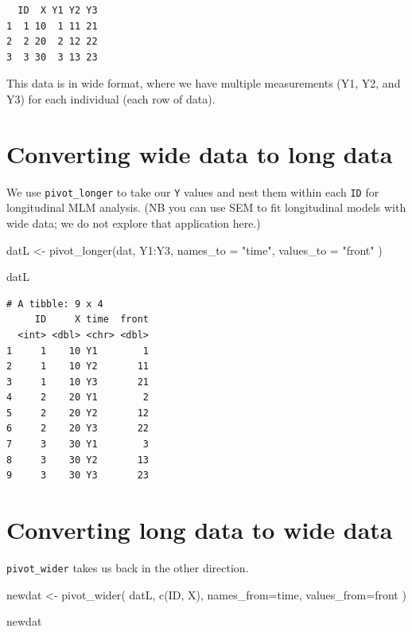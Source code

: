 \documentclass[
  letterpaper,
  DIV=11,
  numbers=noendperiod]{scrreprt}
\newenvironment{Shaded}{\begin{snugshade}}{\end{snugshade}}
\newcommand{\AttributeTok}[1]{\textcolor[rgb]{0.49,0.56,0.16}{#1}}
\newcommand{\FunctionTok}[1]{\textcolor[rgb]{0.02,0.16,0.49}{#1}}
\newcommand{\NormalTok}[1]{\textcolor[rgb]{0.00,0.44,0.13}{#1}}
\newcommand{\OtherTok}[1]{\textcolor[rgb]{0.00,0.44,0.13}{#1}}
\newcommand{\SpecialCharTok}[1]{\textcolor[rgb]{0.25,0.44,0.63}{#1}}
\newcommand{\StringTok}[1]{\textcolor[rgb]{0.25,0.44,0.63}{#1}}
\begin{document}
\begin{verbatim}
  ID  X Y1 Y2 Y3
1  1 10  1 11 21
2  2 20  2 12 22
3  3 30  3 13 23
\end{verbatim}

This data is in wide format, where we have multiple measurements (Y1,
Y2, and Y3) for each individual (each row of data).

\hypertarget{converting-wide-data-to-long-data}{%
\section{Converting wide data to long
data}\label{converting-wide-data-to-long-data}}

We use \texttt{pivot\_longer} to take our \texttt{Y} values and nest
them within each \texttt{ID} for longitudinal MLM analysis. (NB you can
use SEM to fit longitudinal models with wide data; we do not explore
that application here.)

\begin{Shaded}
\begin{Highlighting}[]
\NormalTok{datL }\OtherTok{\textless{}{-}} \FunctionTok{pivot\_longer}\NormalTok{(dat, Y1}\SpecialCharTok{:}\NormalTok{Y3, }
                     \AttributeTok{names\_to =} \StringTok{"time"}\NormalTok{, }
                     \AttributeTok{values\_to =} \StringTok{"front"}\NormalTok{ )}

\NormalTok{datL}
\end{Highlighting}
\end{Shaded}

\begin{verbatim}
# A tibble: 9 x 4
     ID     X time  front
  <int> <dbl> <chr> <dbl>
1     1    10 Y1        1
2     1    10 Y2       11
3     1    10 Y3       21
4     2    20 Y1        2
5     2    20 Y2       12
6     2    20 Y3       22
7     3    30 Y1        3
8     3    30 Y2       13
9     3    30 Y3       23
\end{verbatim}

\hypertarget{converting-long-data-to-wide-data}{%
\section{Converting long data to wide
data}\label{converting-long-data-to-wide-data}}

\texttt{pivot\_wider} takes us back in the other direction.

\begin{Shaded}
\begin{Highlighting}[]
\NormalTok{newdat }\OtherTok{\textless{}{-}} \FunctionTok{pivot\_wider}\NormalTok{( datL, }\FunctionTok{c}\NormalTok{(ID, X), }
                       \AttributeTok{names\_from=}\NormalTok{time, }
                       \AttributeTok{values\_from=}\NormalTok{front  )}

\NormalTok{newdat}
\end{Highlighting}
\end{Shaded}
\end{document}
